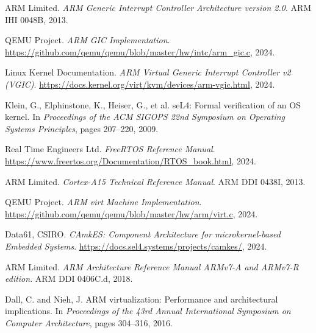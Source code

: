 \documentclass[12pt,a4paper]{article}
\begin{document}

\begin{thebibliography}{10}

ARM Limited.
\newblock \emph{ARM Generic Interrupt Controller Architecture version 2.0}.
\newblock ARM IHI 0048B, 2013.

QEMU Project.
\newblock \emph{ARM GIC Implementation}.
\newblock \url{https://github.com/qemu/qemu/blob/master/hw/intc/arm_gic.c}, 2024.

Linux Kernel Documentation.
\newblock \emph{ARM Virtual Generic Interrupt Controller v2 (VGIC)}.
\newblock \url{https://docs.kernel.org/virt/kvm/devices/arm-vgic.html}, 2024.

Klein, G., Elphinstone, K., Heiser, G., et al.
\newblock seL4: Formal verification of an OS kernel.
\newblock In \emph{Proceedings of the ACM SIGOPS 22nd Symposium on Operating Systems Principles}, pages 207–220, 2009.

Real Time Engineers Ltd.
\newblock \emph{FreeRTOS Reference Manual}.
\newblock \url{https://www.freertos.org/Documentation/RTOS_book.html}, 2024.

ARM Limited.
\newblock \emph{Cortex-A15 Technical Reference Manual}.
\newblock ARM DDI 0438I, 2013.

QEMU Project.
\newblock \emph{ARM virt Machine Implementation}.
\newblock \url{https://github.com/qemu/qemu/blob/master/hw/arm/virt.c}, 2024.

Data61, CSIRO.
\newblock \emph{CAmkES: Component Architecture for microkernel-based Embedded Systems}.
\newblock \url{https://docs.sel4.systems/projects/camkes/}, 2024.

ARM Limited.
\newblock \emph{ARM Architecture Reference Manual ARMv7-A and ARMv7-R edition}.
\newblock ARM DDI 0406C.d, 2018.

Dall, C. and Nieh, J.
\newblock ARM virtualization: Performance and architectural implications.
\newblock In \emph{Proceedings of the 43rd Annual International Symposium on Computer Architecture}, pages 304–316, 2016.

\end{thebibliography}
\end{document}
